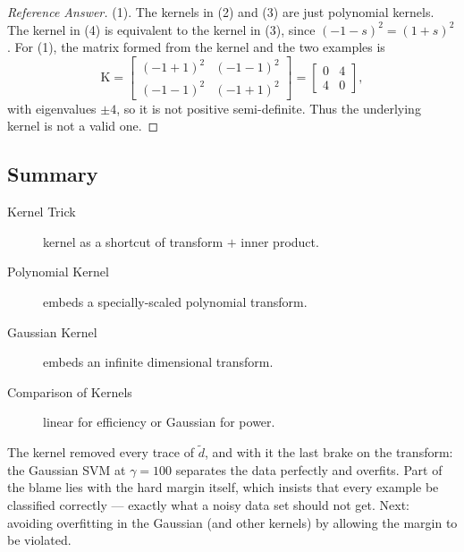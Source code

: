 \begin{proof}[Reference Answer]
    (1). The kernels in (2) and (3) are just polynomial kernels. The kernel
    in (4) is equivalent to the kernel in (3), since \((-1 - s)^2 = (1 +
    s)^2\). For (1), the matrix formed from the kernel and the two examples
    is
    \[
        \mathrm{K} = \begin{bmatrix} (-1 + 1)^2 & (-1 - 1)^2 \\ (-1 - 1)^2 &
        (-1 + 1)^2 \end{bmatrix} = \begin{bmatrix} 0 & 4 \\ 4 & 0
        \end{bmatrix},
    \]
    with eigenvalues \(\pm 4\), so it is not positive semi-definite. Thus the
    underlying kernel is not a valid one.
\end{proof}

\hrulebar

\subsection*{Summary}

\begin{description}
    \item[Kernel Trick] kernel as a shortcut of transform \(+\) inner
        product.
    \item[Polynomial Kernel] embeds a specially-scaled polynomial transform.
    \item[Gaussian Kernel] embeds an infinite dimensional transform.
    \item[Comparison of Kernels] linear for efficiency or Gaussian for
        power.
\end{description}

The kernel removed every trace of \(\tilde{d}\), and with it the last brake
on the transform: the Gaussian SVM at \(\gamma = 100\) separates the data
perfectly and overfits. Part of the blame lies with the hard margin itself,
which insists that every example be classified correctly --- exactly what a
noisy data set should not get. Next: avoiding overfitting in the Gaussian
(and other kernels) by allowing the margin to be violated.
